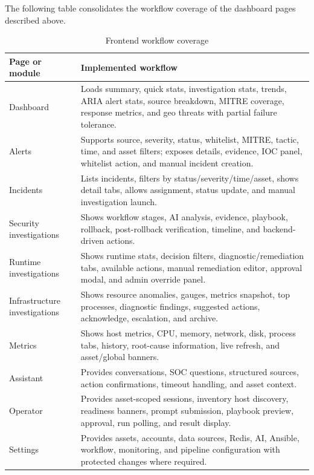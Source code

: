 \FloatBarrier
{}
The following table consolidates the workflow coverage of the dashboard pages described above.

\begin{table}[H]
\centering
\caption{Frontend workflow coverage}
\begin{tabularx}{\textwidth}{@{}p{}Y@{}}
\toprule
\textbf{Page or module} & \textbf{Implemented workflow} \\
\midrule
Dashboard & Loads summary, quick stats, investigation stats, trends, ARIA alert stats, source breakdown, MITRE coverage, response metrics, and geo threats with partial failure tolerance. \\
Alerts & Supports source, severity, status, whitelist, MITRE, tactic, time, and asset filters; exposes details, evidence, IOC panel, whitelist action, and manual incident creation. \\
Incidents & Lists incidents, filters by status/severity/time/asset, shows detail tabs, allows assignment, status update, and manual investigation launch. \\
Security investigations & Shows workflow stages, AI analysis, evidence, playbook, rollback, post-rollback verification, timeline, and backend-driven actions. \\
Runtime investigations & Shows runtime stats, decision filters, diagnostic/remediation tabs, available actions, manual remediation editor, approval modal, and admin override panel. \\
Infrastructure investigations & Shows resource anomalies, gauges, metrics snapshot, top processes, diagnostic findings, suggested actions, acknowledge, escalation, and archive. \\
Metrics & Shows host metrics, CPU, memory, network, disk, process tabs, history, root-cause information, live refresh, and asset/global banners. \\
Assistant & Provides conversations, SOC questions, structured sources, action confirmations, timeout handling, and asset context. \\
Operator & Provides asset-scoped sessions, inventory host discovery, readiness banners, prompt submission, playbook preview, approval, run polling, and result display. \\
Settings & Provides assets, accounts, data sources, Redis, AI, Ansible, workflow, monitoring, and pipeline configuration with protected changes where required. \\
\bottomrule
\end{tabularx}
\end{table}

